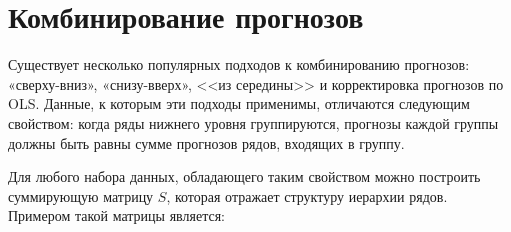 \documentclass[12pt,a4paper, oneside]{extreport}
\begin{document}
%
%
%
%
%
%
%

\section{Комбинирование прогнозов}

Существует несколько   популярных     подходов к комбинированию прогнозов:   «сверху-вниз», «снизу-вверх», <<из середины>> и корректировка прогнозов по OLS. 
Данные, к которым эти подходы  применимы, отличаются следующим свойством: 
когда ряды нижнего уровня  группируются, прогнозы каждой группы должны быть равны сумме прогнозов рядов, входящих в  группу.

Для любого набора данных, обладающего  таким свойством можно построить суммирующую матрицу $S$, которая отражает  структуру иерархии рядов. 
Примером такой матрицы является:
\end{document}
